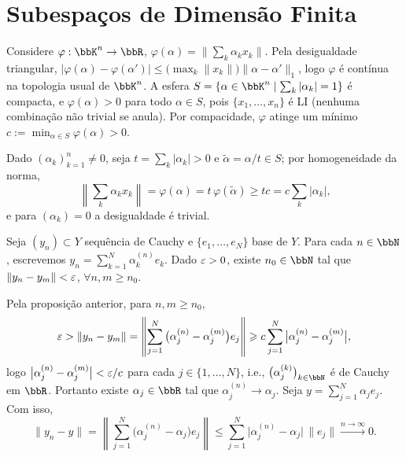 
\section{Subespaços de Dimensão Finita}


\begin{myproof}
	Considere $\varphi:\bbK^n\to\bbR$, $\varphi(\alpha)=\big\|\sum_k\alpha_kx_k\big\|$. Pela desigualdade
	triangular, $|\varphi(\alpha)-\varphi(\alpha')|\leq\big(\max_k\|x_k\|\big)\|\alpha-\alpha'\|_1$, logo
	$\varphi$ é contínua na topologia usual de $\bbK^n$. A esfera $S=\{\alpha\in\bbK^n \mid
	\sum_k|\alpha_k|=1\}$ é compacta, e $\varphi(\alpha)>0$ para todo $\alpha\in S$, pois
	$\{x_1,\dots,x_n\}$ é LI (nenhuma combinação não trivial se anula). Por compacidade, $\varphi$ atinge
	um mínimo $c:=\min_{\alpha\in S}\varphi(\alpha)>0$.

	Dado $(\alpha_k)_{k=1}^{n}\neq 0$, seja $t=\sum_k|\alpha_k|>0$ e $\tilde\alpha=\alpha/t\in S$; por
	homogeneidade da norma,
	$$\left\|\sum_k\alpha_kx_k\right\|=\varphi(\alpha)=t\,\varphi(\tilde\alpha)\geq tc=c\sum_k|\alpha_k|\text{,}$$
	e para $(\alpha_k)=0$ a desigualdade é trivial.
\end{myproof}

\begin{myproof}
	Seja $(y_n)\subset Y$ sequência de Cauchy e $\{e_1,\dots,e_N\}$ base de $Y$. Para cada $n\in\bbN$,
	escrevemos $y_n=\sum_{k=1}^{N}\alpha_k^{(n)}e_k$. Dado $\varepsilon>0$, existe $n_0\in\bbN$ tal que
	$\|y_n-y_m\|<\varepsilon$, $\forall n,m\geq n_0$.

	Pela proposição anterior, para $n,m\geq n_0$,
	$$\varepsilon>\|y_n-y_m\|=\left\|\sum_{j=1}^{N}\big(\alpha_j^{(n)}-\alpha_j^{(m)}\big)e_j\right\|\geqslant
	c\sum_{j=1}^{N}\big|\alpha_j^{(n)}-\alpha_j^{(m)}\big|\text{,}$$
	logo $\big|\alpha_j^{(n)}-\alpha_j^{(m)}\big|<\varepsilon/c$ para cada $j\in\{1,\dots,N\}$, i.e.,
	$\big(\alpha_j^{(k)}\big)_{k\in\bbN}$ é de Cauchy em $\bbR$. Portanto existe $\alpha_j\in\bbR$ tal que
	$\alpha_j^{(n)}\to\alpha_j$. Seja $y=\sum_{j=1}^{N}\alpha_je_j$. Com isso,
	$$\|y_n-y\|=\left\|\sum_{j=1}^{N}\big(\alpha_j^{(n)}-\alpha_j\big)e_j\right\|\leq
	\sum_{j=1}^{N}\big|\alpha_j^{(n)}-\alpha_j\big|\,\|e_j\|\xrightarrow{n\to\infty}0\text{.}$$
\end{myproof}

